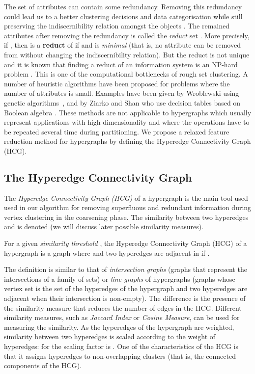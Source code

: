 \documentclass[twocolumn]{svjour3}          \smartqed
\begin{document}
The set of attributes can contain some redundancy. Removing this redundancy could lead us to a better clustering decisions and data categorisation while still preserving the indiscernibility relation amongst the objects \cite{wroblewski1998,ziarko1995}. The remained attributes after removing the redundancy is called the \textit{reduct} set \cite{roughreview2009}.  More precisely, if , then  is a \textbf{reduct} of  if  and  is \emph{minimal} (that is, no attribute can be removed from  without changing the indiscernibility relation).  But the reduct is not unique and it is known that 
finding a reduct of an information system is an NP-hard problem \cite{skowron1992}. This is one of the computational bottlenecks of rough set 
clustering. A number of heuristic algorithms have been proposed for problems where the number of attributes is small. Examples have been given by Wroblewski using genetic algorithms~\cite{wroblewski1995,wroblewski1998}, and by Ziarko and Shan who use decision tables based on Boolean algebra \cite{ziarko1995}. These methods are not applicable to hypergraphs which usually represent applications with high dimensionality and where the operations have to be repeated several time during partitioning. We propose a relaxed feature reduction method for hypergraphs by defining the Hyperedge Connectivity Graph (HCG).

\subsection{The Hyperedge Connectivity Graph}\label{sec:hcg}

The \textit{Hyperedge Connectivity Graph (HCG)} of a hypergraph is the main tool used used in our algorithm for removing superfluous and redundant information during vertex clustering in the coarsening phase.  The similarity between two hyperedges  and  is denoted  (we will discuss later possible similarity measures). 

\begin{definition}  \label{def:hcg}
For a given \textit{similarity threshold} , the Hyperedge Connectivity Graph (HCG) of a hypergraph  is a graph  where  and two hyperedges  are adjacent in  if .
\end{definition}

The definition is similar to that of \textit{intersection graphs} \cite{erdos1966representation} (graphs that represent the intersections of a family of sets) or  \textit{line graphs} of  hypergraphs (graphs whose vertex set is the set of the hyperedges of the hypergraph and two hyperedges are adjacent when their intersection is non-empty). The difference is the presence of the similarity measure that reduces the number of edges in the HCG. Different similarity measures, such as \textit{Jaccard Index} or \textit{Cosine Measure}, can be used for measuring the similarity. As the hyperedges of the hypergraph are weighted, similarity between two hyperedges is scaled according to the weight of hyperedges: for  the scaling factor is . One of the characteristics of the HCG is that it assigns hyperedges to non-overlapping clusters (that is, the connected components of the HCG).
\end{document}
